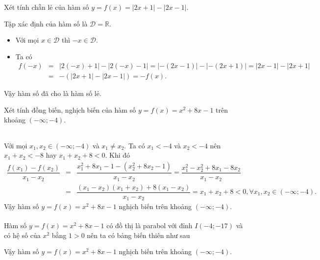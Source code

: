 \begin{bt}%
 Xét tính chẵn lẻ của hàm số $y=f(x)=|2x+1|-|2x-1|$.
 \loigiai
  {
  Tập xác định của hàm số là $\mathscr{D}=\mathbb{R}$.
  \begin{itemize}
   \item Với mọi $x \in \mathscr{D}$ thì $-x \in \mathscr{D}$.
   \item Ta có
   \allowdisplaybreaks
   \begin{eqnarray*}
    f(-x) &=& |2(-x)+1|-|2(-x)-1| = |-(2x-1)|-|-(2x+1)| = |2x-1|-|2x+1|\\
    &=& -\left(|2x+1|-|2x-1|\right) = -f(x).
   \end{eqnarray*}
  \end{itemize}
  Vậy hàm số đã cho là hàm số lẻ.
  }
\end{bt}

\begin{bt}%
 Xét tính đồng biến, nghịch biến của hàm số $y=f(x)=x^2+8x-1$ trên khoảng $(-\infty;-4)$.
 \loigiai
  {
  \\
  Với mọi $x_1,x_2 \in (-\infty;-4)$ và $x_1\neq x_2$. Ta có $x_1<-4$ và $x_2<-4$ nên $x_1+x_2<-8$ hay $x_1+x_2+8<0$. Khi đó
  \allowdisplaybreaks
  \begin{eqnarray*}
   \dfrac{f(x_1)-f(x_2)}{x_1-x_2} &=& \dfrac{x_1^2+8x_1-1 - (x_2^2+8x_2-1)}{x_1-x_2} = \dfrac{x_1^2-x_2^2 + 8x_1-8x_2}{x_1-x_2}\\
   &=& \dfrac{(x_1-x_2)(x_1+x_2)+8(x_1-x_2)}{x_1-x_2} = x_1+x_2+8 < 0, \forall x_1,x_2 \in (-\infty;-4).
  \end{eqnarray*}
  Vậy hàm số $y=f(x)=x^2+8x-1$ nghịch biến trên khoảng $(-\infty;-4)$.\\
  \\
  Hàm số $y=f(x)=x^2+8x-1$ có đồ thị là parabol với đỉnh $I(-4;-17)$ và có hệ số của $x^2$ bằng $1>0$ nên ta có bảng biến thiên như sau
  \begin{center}
  \end{center}
  Vậy hàm số $y=f(x)=x^2+8x-1$ nghịch biến trên khoảng $(-\infty;-4)$.
  }
\end{bt}

